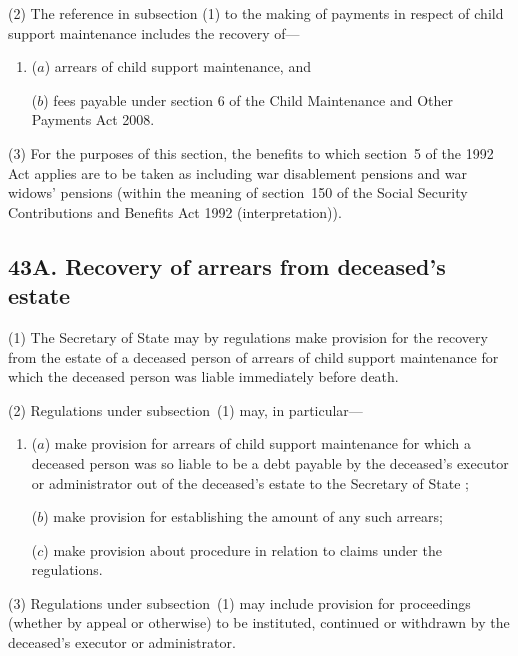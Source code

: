\documentclass[12pt,a4paper]{article}
\begin{document}
(2) The reference in subsection (1) to the making of payments in respect of child support maintenance includes the recovery of—
\begin{enumerate}\item[]
($a$) arrears of child support maintenance, and

($b$) fees payable under section 6 of the Child Maintenance and Other Payments Act 2008.
\end{enumerate}

(3) For the purposes of this section, the benefits to which section~5 of the 1992 Act applies are to be taken as including war disablement pensions and war widows' pensions (within the meaning of section~150 of the Social Security Contributions and Benefits Act 1992 (interpretation)).


\subsection{43A. Recovery of arrears from deceased's estate}

(1) The Secretary of State may by regulations make provision for the recovery from the estate of a deceased person of arrears of child support maintenance for which the deceased person was liable immediately before death.

(2) Regulations under subsection~(1) may, in particular---
\begin{enumerate}\item[]
($a$) make provision for arrears of child support maintenance for which a deceased person was so liable to be a debt payable by the deceased’s executor or administrator out of the deceased’s estate to the 
Secretary of State%
;

($b$) make provision for establishing the amount of any such arrears;

($c$) make provision about procedure in relation to claims under the regulations.
\end{enumerate}

(3) Regulations under subsection~(1) may include provision for proceedings (whether by appeal or otherwise) to be instituted, continued or withdrawn by the deceased’s executor or administrator.
\end{document}
